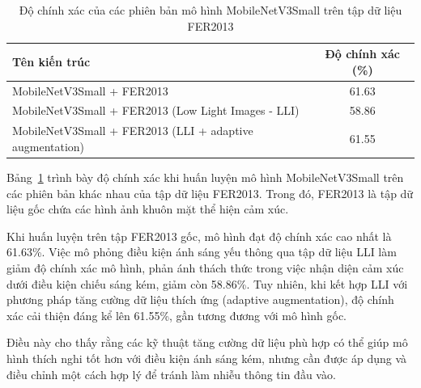 \begin{table}[H]
\centering
\caption{Độ chính xác của các phiên bản mô hình MobileNetV3Small trên tập dữ liệu FER2013}
\begin{tabular}{@{}lc@{}}
\toprule
\textbf{Tên kiến trúc} & \textbf{Độ chính xác (\%)} \\ \midrule
MobileNetV3Small + FER2013 & 61.63 \\
MobileNetV3Small + FER2013 (Low Light Images - LLI) & 58.86 \\
MobileNetV3Small + FER2013 (LLI + adaptive augmentation) & 61.55 \\ \bottomrule
\end{tabular}
\label{tab:training-results}
\end{table}

Bảng~\ref{tab:training-results} trình bày độ chính xác khi huấn luyện mô hình MobileNetV3Small trên các phiên bản khác nhau của tập dữ liệu FER2013. Trong đó, FER2013 là tập dữ liệu gốc chứa các hình ảnh khuôn mặt thể hiện cảm xúc. 

Khi huấn luyện trên tập FER2013 gốc, mô hình đạt độ chính xác cao nhất là 61.63\%. Việc mô phỏng điều kiện ánh sáng yếu thông qua tập dữ liệu LLI làm giảm độ chính xác mô hình, phản ánh thách thức trong việc nhận diện cảm xúc dưới điều kiện chiếu sáng kém, giảm còn 58.86\%. Tuy nhiên, khi kết hợp LLI với phương pháp tăng cường dữ liệu thích ứng (adaptive augmentation), độ chính xác cải thiện đáng kể lên 61.55\%, gần tương đương với mô hình gốc. 

Điều này cho thấy rằng các kỹ thuật tăng cường dữ liệu phù hợp có thể giúp mô hình thích nghi tốt hơn với điều kiện ánh sáng kém, nhưng cần được áp dụng và điều chỉnh một cách hợp lý để tránh làm nhiễu thông tin đầu vào.




